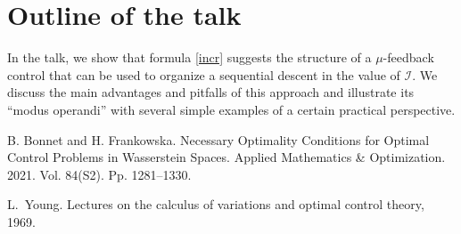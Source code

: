 \documentclass[12pt]{llncs}
\begin{document}
\section{Outline of the talk}


In the talk, we show that formula \eqref{incr} suggests the structure of a $\mu$-feedback control that can be used to organize a sequential descent in the value of $\mathcal I$. We discuss the main advantages and pitfalls of this approach and  illustrate its ``modus operandi'' with several simple examples of a certain practical perspective. 


\begin{thebibliography}{9} %
 B. Bonnet and H. Frankowska. Necessary Optimality Conditions for Optimal Control Problems in Wasserstein Spaces. Applied Mathematics \& Optimization. 2021. Vol. 84(S2). Pp. 1281--1330.

  L.~Young. Lectures on the calculus of variations and optimal control theory, 1969.

\end{thebibliography}

\end{document}
